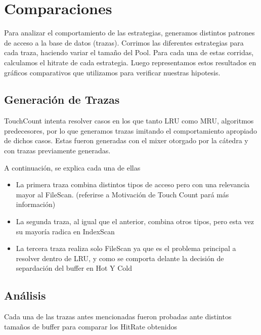 \section{Comparaciones}
Para analizar el comportamiento de las estrategias, generamos distintos patrones de
acceso a la base de datos (trazas). Corrimos las diferentes estrategias para cada traza,
haciendo variar el tamaño del Pool. Para cada una de estas corridas, calculamos el 
hitrate de cada estrategia. Luego representamos estos resultados en gráficos comparativos
que utilizamos para verificar nuestras hipotesis.

\subsection{Generación de Trazas}
TouchCount intenta resolver casos en los que tanto LRU como MRU, algoritmos predecesores, por lo que
generamos trazas imitando el comportamiento apropiado de dichos casos. Estas fueron generadas con
el mixer otorgado por la cátedra y con trazas previamente generadas. 

A continuación, se explica cada una de ellas

\begin{itemize}
\item{La primera traza combina distintos tipos de acceso pero con una relevancia mayor al FileScan. 
(referirse a Motivación de Touch Count pará más información)}
\item{La segunda traza, al igual que el anterior, combina otros tipos, pero esta vez su mayoría radica en IndexScan}
\item{La tercera traza realiza solo FileScan ya que es el problema principal a resolver dentro de LRU, y como se comporta delante la decisión de separdación del buffer en Hot Y Cold}
\end{itemize}

\subsection{Análisis}
Cada una de las trazas antes mencionadas fueron probadas ante distintos tamaños de buffer para comparar los HitRate obtenidos

